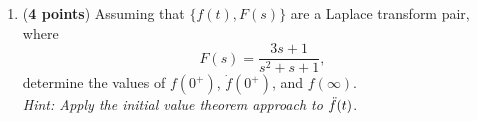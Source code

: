\documentclass[]{book}
\begin{document}
\begin{enumerate}
\item (\textbf{4 points}) Assuming that $\{f(t),F(s)\}$ are a Laplace transform pair, where
$$F(s)=\frac{3s+1}{s^2+s+1},$$
determine the values of $f(0^+)$, $\Dot{f}(0^+)$, and $f(\infty)$.\vspace{0.2 cm}\\
\textit{Hint: Apply the initial value theorem approach to} $\Ddot{f}(t)$.
\vspace{0.4 cm}

\end{enumerate}
\end{document}
